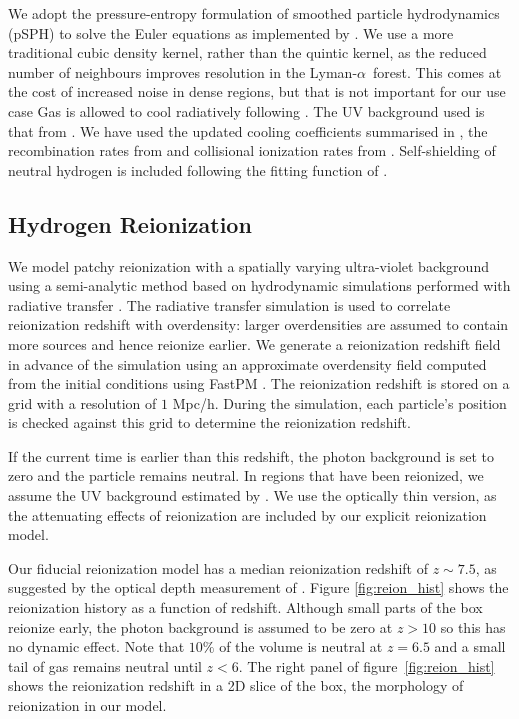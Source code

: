 \documentclass[a4paper,11pt]{article}
\newcommand{\Lya}{Lyman-$\alpha$}
\begin{document}
We adopt the pressure-entropy formulation of smoothed particle hydrodynamics (pSPH) to solve the Euler equations \citep{Hopkins:2013,Read:2010} as implemented by \cite{Feng:2014}. %
We use a more traditional cubic density kernel, rather than the quintic kernel, as the reduced number of neighbours improves resolution in the \Lya~forest. This comes at the cost of increased noise in dense regions, but that is not important for our use case
Gas is allowed to cool radiatively following \citep{Katz:1996}. The UV background used is that from \cite{FG2020}.
We have used the updated cooling coefficients summarised in \cite{Bolton:2017}, the recombination rates from \cite{Verner:1996} and collisional ionization rates from \cite{Voronov:1997}. Self-shielding of neutral hydrogen is included following the fitting function of \cite{Rahmati:2013}.

\subsection{Hydrogen Reionization}
\label{sec:hydrogen}

We model patchy reionization with a spatially varying ultra-violet background using a semi-analytic method based on hydrodynamic simulations performed with radiative transfer \cite{Battaglia:2013}. The radiative transfer simulation is used to correlate reionization redshift with overdensity:  larger overdensities are assumed to contain more sources and hence reionize earlier. We generate a reionization redshift field in advance of the simulation using an approximate overdensity field computed from the initial conditions using FastPM \citep{2016MNRAS.463.2273F}. The reionization redshift is stored on a grid with a resolution of $1$ Mpc/h. During the simulation, each particle's position is checked against this grid to determine the reionization redshift.

If the current time is earlier than this redshift, the photon background is set to zero and the particle remains neutral. In regions that have been reionized, we assume the UV background estimated by \cite{2020MNRAS.493.1614F}. We use the optically thin version, as the attenuating effects of reionization are included by our explicit reionization model.

Our fiducial reionization model has a median reionization redshift of $z \sim 7.5$, as suggested by the optical depth measurement of \cite{Planck}. Figure \ref{fig:reion_hist} shows the reionization history as a function of redshift. Although small parts of the box reionize early, the photon background is assumed to be zero at $z>10$ so this has no dynamic effect. Note that $10\%$ of the volume is neutral at $z=6.5$ and a small tail of gas remains neutral until $z < 6$. The right panel of figure~\ref{fig:reion_hist} shows the reionization redshift in a 2D slice of the box, the morphology of reionization in our model.
\end{document}
